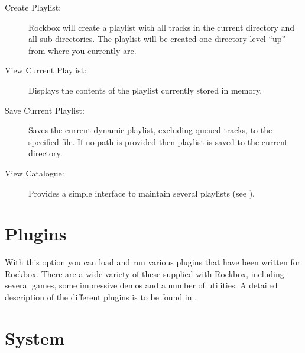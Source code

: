 \begin{description}
\item[Create Playlist:]
  Rockbox will create a playlist with all tracks in the current directory 
and all sub-directories. The playlist will be created one directory level ``up'' 
from where you currently are.
  
\item[View Current Playlist:]
  Displays the contents of the playlist currently stored in memory.
  
\item[Save Current Playlist:]
  Saves the current dynamic playlist, excluding queued tracks, to the 
specified file. If no path is provided then playlist is saved to the current 
directory.

\item[View Catalogue:]
  Provides a simple interface to maintain
  several playlists (see ).
\end{description}

\section{Plugins}
  With this option you can load and run various plugins that have been
written for Rockbox. There are a wide variety of these supplied with
Rockbox, including several games, some impressive demos and a number of
utilities. A detailed description of the different plugins is to be found in 
.

\section{\label{ref:Info}System}

